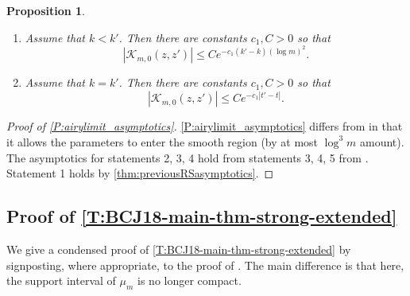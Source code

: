 \documentclass[11pt,twoside]{amsart}
\theoremstyle{plain}
\newtheorem{prop}[thm]{Proposition}
\numberwithin{quest}{section}
\theoremstyle{remark}
\numberwithin{rem}{section}
\theoremstyle{definition}
\begin{document}
\begin{prop}
\begin{enumerate}[label=\arabic*.]
\begin{enumerate}
		\end{enumerate}
		
		
		\item Assume that $k<k'$. Then there are constants $c_1,C>0$ so that
		\begin{equation*}
			|\mathcal{K}_{m,0}(z,z')| \leq C e^{-c_1(k'-k)(\log m)^2}.
		\end{equation*}
		\item  Assume that $k=k'$.  Then there are constants $c_1,C>0$ so that
		\begin{equation*}
			|\mathcal{K}_{m,0}(z,z')| \leq C e^{-c_1|t'-t|}.
		\end{equation*}
	\end{enumerate}
\end{prop}
\begin{proof}[Proof of \cref{P:airylimit_asymptotics}] 
	\cref{P:airylimit_asymptotics} differs from \cite[Proposition 3.1]{BCJ18} in that it allows the parameters to enter the smooth region (by at most $\log^3 m$ amount).  The asymptotics for statements 2, 3, 4 hold from statements 3, 4, 5 from \cite[Proposition 3.1]{BCJ18}.  Statement 1 holds by \cref{thm:previousRSasymptotics}.  	
\end{proof}



\subsection{Proof of \cref{T:BCJ18-main-thm-strong-extended}}



We give a condensed proof of \cref{T:BCJ18-main-thm-strong-extended} by signposting, where appropriate, to the proof of \cite[Theorem 1.1]{BCJ18}. The main difference is that here, the support interval of $\mu_m$ is no longer compact. 
\end{document}
